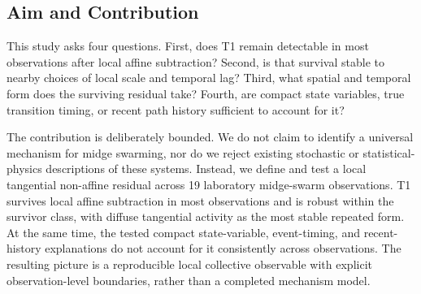 \subsection{Aim and Contribution}

This study asks four questions. First, does T1 remain detectable in most
observations after local affine subtraction? Second, is that survival stable to
nearby choices of local scale and temporal lag? Third, what spatial and
temporal form does the surviving residual take? Fourth, are compact state
variables, true transition timing, or recent path history sufficient to
account for it?

The contribution is deliberately bounded. We do not claim to identify a
universal mechanism for midge swarming, nor do we reject existing stochastic or
statistical-physics descriptions of these systems. Instead, we define and test
a local tangential non-affine residual across 19 laboratory midge-swarm
observations. T1 survives local affine subtraction in most observations and is
robust within the survivor class, with diffuse tangential activity as the most
stable repeated form. At the same time, the tested compact state-variable,
event-timing, and recent-history explanations do not account for it
consistently across observations. The resulting picture is a reproducible
local collective observable with explicit observation-level boundaries, rather
than a completed mechanism model.
